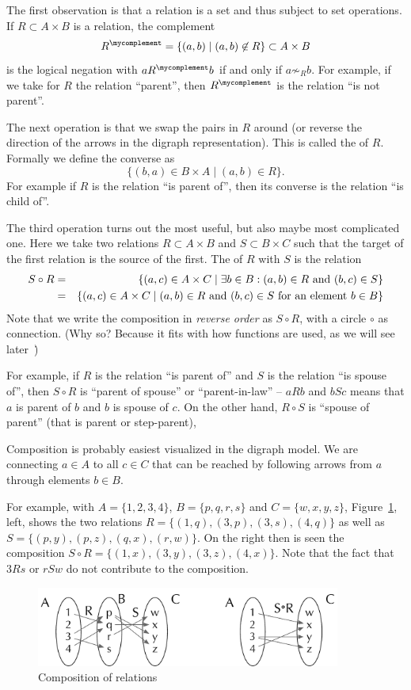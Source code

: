 The first observation is that a relation is a set and thus subject to set
operations. If $R\subset A\times B$ is a relation, the complement
\[
R^\mycomplement=\{(a,b)\mid (a,b)\not\in R\}\subset A\times B
\]
is the logical negation with $aR^\mycomplement b$ if and only if
$a\not\sim_R b$. For example,
if we take for $R$ the relation ``parent'', then $R^\mycomplement$ is the
relation ``is not parent''.
\medskip

The next operation is that we swap the pairs in $R$ around (or reverse the
direction of the arrows in the digraph representation). This is called the
 of $R$. Formally we define the converse as
\[
\{(b,a)\in B\times A\mid (a,b)\in R\}.
\]
For example if $R$ is the relation ``is parent of'', then its converse is
the relation ``is child of''.
\medskip

The third operation turns out the most useful, but also maybe most
complicated one. Here we take two relations $R\subset A\times B$ and
$S\subset B\times C$ such that the target of the first relation is the
source of the first. The  of $R$ with $S$ is the
relation 
\begin{eqnarray*}
S\circ R&=&\{(a,c)\in A\times C\mid \exists b\in B: (a,b)\in R\mbox{\ and\
}(b,c)\in S\}\\
&=&\{(a,c)\in A\times C\mid (a,b)\in R\mbox{\ and\ }(b,c)\in S
\mbox{\ for an element $b\in B$}\}
\end{eqnarray*}
Note that we write the composition in {\em reverse order} as $S\circ R$,
with a circle $\circ$ as connection. (Why so? Because it fits with how
functions are used, as we will see later~\pointer{secfunccomposition}\.)

For example, if $R$ is the relation ``is parent of'' and $S$ is the relation
``is spouse of'', then $S\circ R$ is ``parent of spouse'' or
``parent-in-law'' -- $aRb$ and $bSc$ means that $a$ is parent of $b$ and $b$
is spouse of $c$.  On the other hand, $R\circ S$ is ``spouse of parent''
(that is parent or step-parent),
\smallskip

Composition is probably easiest visualized in the digraph model. We are
connecting $a\in A$ to all $c\in C$ that can be reached by following arrows
from $a$ through elements $b\in B$.

For example, with $A=\{1,2,3,4\}$, $B=\{p,q,r,s\}$ and $C=\{w,x,y,z\}$,
Figure~\ref{figcompdig}, left, shows the two relations
$R=\{(1,q),(3,p),(3,s),(4,q)\}$ as well as $S=\{(p,y),(p,z),(q,x),(r,w)\}$. On the
right then is seen the composition $S\circ R=\{(1,x),(3,y),(3,z),(4,x)\}$.
Note that the fact that $3Rs$ or $rSw$ do not contribute to the composition.
\begin{figure}[t]
\begin{center}
\includegraphics[width=10cm]{pic/CompositionDigraph.pdf}
\end{center}
\caption{Composition of relations}
\label{figcompdig}
\end{figure}

